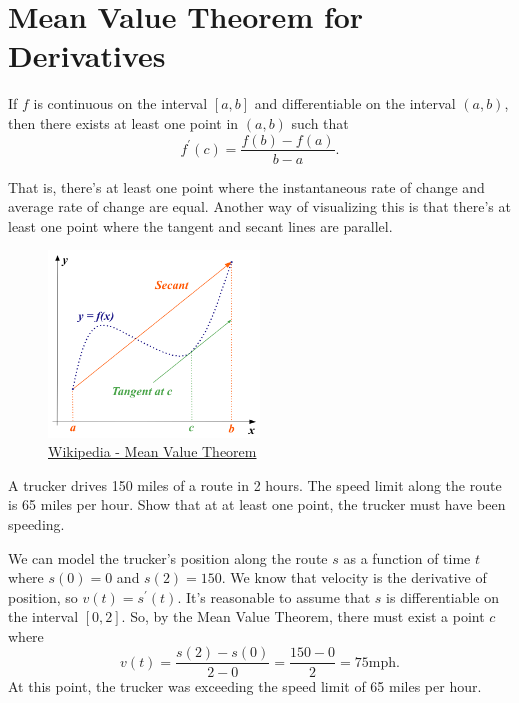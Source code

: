 \section{Mean Value Theorem for Derivatives}
\begin{theorem}
	If $f$ is continuous on the interval $[a,b]$ and differentiable on the interval $(a,b)$, then there exists at least one point in $(a,b)$ such that
	\begin{equation*}
		f^\prime(c) = \frac{f(b)-f(a)}{b-a}.
	\end{equation*}
\end{theorem}

That is, there's at least one point where the instantaneous rate of change and average rate of change are equal.
Another way of visualizing this is that there's at least one point where the tangent and secant lines are parallel.

\begin{figure}[H]
	\label{mvt_derivatives}
	\centering
	\includegraphics[width = 0.5\textwidth]{./applications_derivative/mvt.png}
	\caption{\hyperref{https://en.wikipedia.org/wiki/Mean\_value\_theorem}{}{}{Wikipedia - Mean Value Theorem}}
\end{figure}

\begin{example}
	A trucker drives 150 miles of a route in 2 hours.
	The speed limit along the route is 65 miles per hour.
	Show that at at least one point, the trucker must have been speeding.
\end{example}
\begin{answer}
	We can model the trucker's position along the route $s$ as a function of time $t$ where $s(0)=0$ and $s(2)=150$.
	We know that velocity is the derivative of position, so $v(t) = s^\prime(t)$.
	It's reasonable to assume that $s$ is differentiable on the interval $[0,2]$.
	So, by the Mean Value Theorem, there must exist a point $c$ where
	\begin{equation*}
		v(t) = \frac{s(2)-s(0)}{2-0} = \frac{150-0}{2} = 75\text{mph}.
	\end{equation*}
	At this point, the trucker was exceeding the speed limit of 65 miles per hour.
\end{answer}

